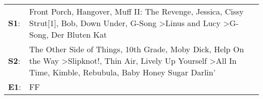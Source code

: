 \begin{supertabular}{p{0.03\textwidth}p{0.92\textwidth}}
 \textbf{S1}:  &                               Front Porch\textsuperscript{}, \enspace Hangover\textsuperscript{}, \enspace Muff II: The Revenge\textsuperscript{}, \enspace Jessica\textsuperscript{}, \enspace Cissy Strut[1]\textsuperscript{}, \enspace Bob\textsuperscript{}, \enspace Down Under\textsuperscript{}, \enspace G-Song\textsuperscript{} \textgreater \enspace Linus and Lucy\textsuperscript{} \textgreater \enspace G-Song\textsuperscript{}, \enspace Der Bluten Kat\textsuperscript{}  \enspace  \\
 \textbf{S2}:  &  The Other Side of Things\textsuperscript{}, \enspace 10th Grade\textsuperscript{}, \enspace Moby Dick\textsuperscript{}, \enspace Help On the Way\textsuperscript{} \textgreater \enspace Slipknot!\textsuperscript{}, \enspace Thin Air\textsuperscript{}, \enspace Lively Up Yourself\textsuperscript{} \textgreater \enspace All In Time\textsuperscript{}, \enspace Kimble\textsuperscript{}, \enspace Rebubula\textsuperscript{}, \enspace Baby Honey Sugar Darlin'\textsuperscript{}  \enspace  \\
 \textbf{E1}:  &                                                                                                                                                                                                                                                                                                                                                                                                                                                                        FF\textsuperscript{}  \enspace  \\
\end{supertabular}
